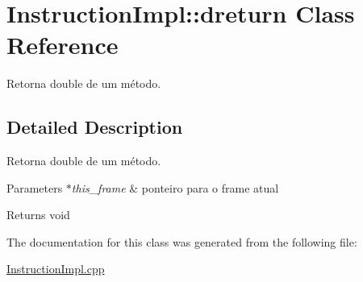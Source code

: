 \hypertarget{class_instruction_impl_1_1dreturn}{}\section{Instruction\+Impl\+:\+:dreturn Class Reference}
\label{class_instruction_impl_1_1dreturn}


Retorna double de um método.  




\subsection{Detailed Description}
Retorna double de um método. 


\begin{DoxyParams}{Parameters}
{\em $\ast$this\+\_\+frame} & ponteiro para o frame atual \\
\hline
\end{DoxyParams}
\begin{DoxyReturn}{Returns}
void 
\end{DoxyReturn}


The documentation for this class was generated from the following file\+:\begin{DoxyCompactItemize}
\item 
\hyperlink{_instruction_impl_8cpp}{Instruction\+Impl.\+cpp}\end{DoxyCompactItemize}
